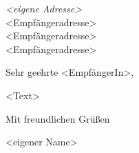 \documentclass[
    sender,
    paper=a4,
    version=last,
    fontsize=11pt,
    DIV=13,
    BCOR=0mm]{scrlttr2}
\begin{document}


\begin{letter}{
	{\footnotesize \textit{<eigene Adresse>}}\\
    <Empfängeradresse>\\
    <Empfängeradresse>\\
    <Empfängeradresse>\\
}
\opening{Sehr geehrte <EmpfängerIn>,}

<Text>\\

\closing{Mit freundlichen Grüßen} %
<eigener Name>
\end{letter}
\end{document}
